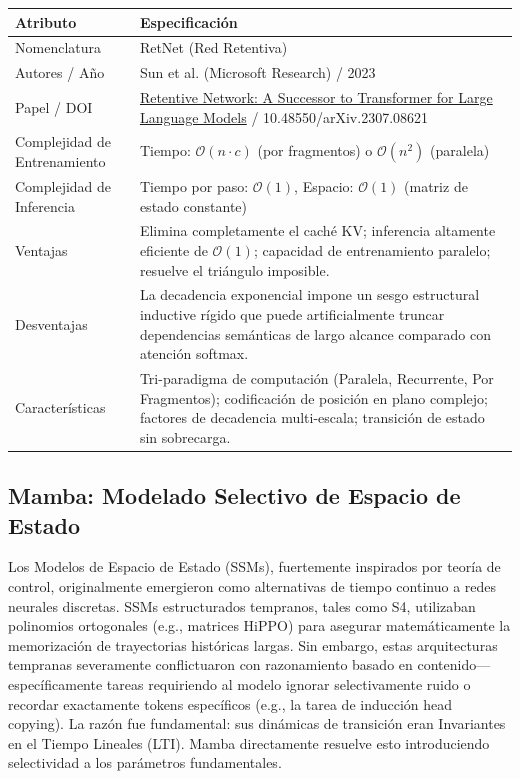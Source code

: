 \documentclass[11pt,a4paper]{article}
\begin{document}
\begin{center}
\begin{tabular}{|l|p{11cm}|}
\hline
\textbf{Atributo} & \textbf{Especificación} \\
\hline
Nomenclatura & RetNet (Red Retentiva) \\
\hline
Autores / Año & Sun et al. (Microsoft Research) / 2023 \\
\hline
Papel / DOI & \href{https://arxiv.org/abs/2307.08621}{Retentive Network: A Successor to Transformer for Large Language Models} / 10.48550/arXiv.2307.08621 \\
\hline
Complejidad de Entrenamiento & Tiempo: $\mathcal{O}(n \cdot c)$ (por fragmentos) o $\mathcal{O}(n^2)$ (paralela) \\
\hline
Complejidad de Inferencia & Tiempo por paso: $\mathcal{O}(1)$, Espacio: $\mathcal{O}(1)$ (matriz de estado constante) \\
\hline
Ventajas & Elimina completamente el caché KV; inferencia altamente eficiente de $\mathcal{O}(1)$; capacidad de entrenamiento paralelo; resuelve el triángulo imposible. \\
\hline
Desventajas & La decadencia exponencial impone un sesgo estructural inductive rígido que puede artificialmente truncar dependencias semánticas de largo alcance comparado con atención softmax. \\
\hline
Características & Tri-paradigma de computación (Paralela, Recurrente, Por Fragmentos); codificación de posición en plano complejo; factores de decadencia multi-escala; transición de estado sin sobrecarga. \\
\hline
\end{tabular}
\end{center}

\subsection{Mamba: Modelado Selectivo de Espacio de Estado}
\label{subsec:mamba}

Los Modelos de Espacio de Estado (SSMs), fuertemente inspirados por teoría de control, originalmente emergieron como alternativas de tiempo continuo a redes neurales discretas. SSMs estructurados tempranos, tales como S4, utilizaban polinomios ortogonales (e.g., matrices HiPPO) para asegurar matemáticamente la memorización de trayectorias históricas largas. Sin embargo, estas arquitecturas tempranas severamente conflictuaron con razonamiento basado en contenido---específicamente tareas requiriendo al modelo ignorar selectivamente ruido o recordar exactamente tokens específicos (e.g., la tarea de inducción head copying). La razón fue fundamental: sus dinámicas de transición eran Invariantes en el Tiempo Lineales (LTI). Mamba directamente resuelve esto introduciendo selectividad a los parámetros fundamentales.
\end{document}
